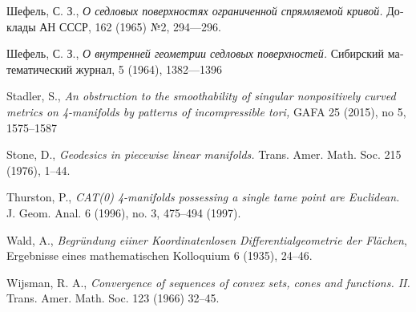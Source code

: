 \begin{thebibliography}{52}
\begin{otherlanguage}{russian}
Шефель, С. З.,
\textit{О седловых поверхностях ограниченной спрямляемой кривой.}
Доклады АН СССР, 162 (1965) №2, 
294---296.
\end{otherlanguage}

\begin{otherlanguage}{russian}
Шефель, С. З., 
\textit{О внутренней геометрии седловых поверхностей.}
Сибирский математический журнал, 5 (1964), 1382---1396
\end{otherlanguage}

Stadler, S.,
\textit{An obstruction to the smoothability of singular nonpositively curved metrics on 4-manifolds by patterns of incompressible tori,}
GAFA
25 (2015), 
no 5, 
1575--1587

Stone, D.,
\textit{Geodesics in piecewise linear manifolds.}
Trans. Amer. Math. Soc. 
215 
(1976), 
1--44.

 Thurston, P.,
\textit{CAT(0) 4-manifolds possessing a single tame point are Euclidean.} 
J. Geom. Anal. 
6 (1996), 
no. 3, 
475--494 (1997). 

 Wald, A., \textit{Begr\"undung eiiner Koordinatenlosen Differentialgeometrie der Fl\"achen}, Ergebnisse eines mathematischen Kolloquium
6  (1935), 24--46.

 Wijsman, R. A., 
\textit{Convergence of sequences of convex sets, cones and functions. II.} 
Trans. Amer. Math. Soc. 
123 (1966) 32--45.


\end{thebibliography}
